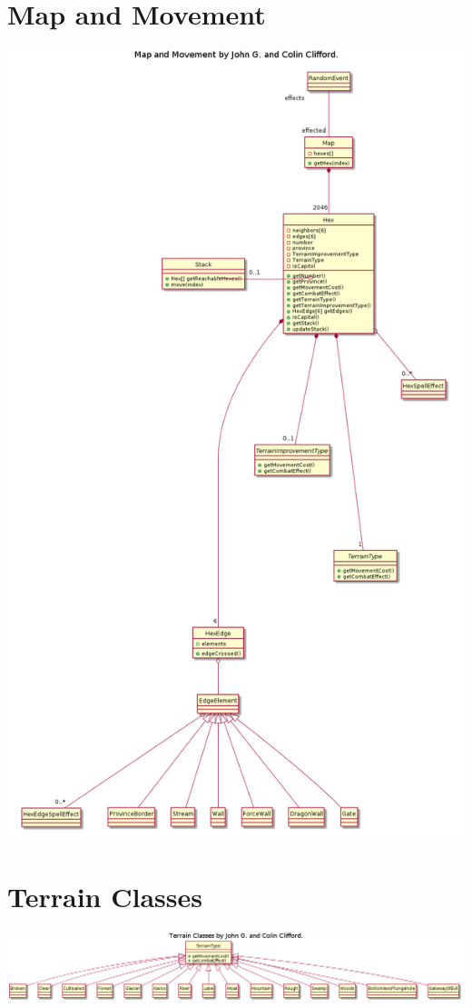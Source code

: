 \documentclass{article}
\begin{document}

\section{Map and Movement}
\includegraphics[width=\textwidth]{pngs/Map.png}

\section{Terrain Classes}
\includegraphics[width=\textwidth]{pngs/TerrainClasses.png}
\end{document}
